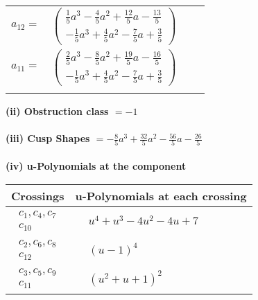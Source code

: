 \documentclass[1p]{elsarticle_modified}
\theoremstyle{definition}
\begin{document}
\begin{tabular}{m{7pt} m{180pt} m{7pt} m{180pt} }
\flushright $a_{12}=$&$\begin{pmatrix}\frac{1}{5} a^3-\frac{4}{5} a^2+\frac{12}{5} a-\frac{13}{5}\\-\frac{1}{5} a^3+\frac{4}{5} a^2-\frac{7}{5} a+\frac{3}{5}\end{pmatrix}$ \\
\flushright $a_{11}=$&$\begin{pmatrix}\frac{2}{5} a^3-\frac{8}{5} a^2+\frac{19}{5} a-\frac{16}{5}\\-\frac{1}{5} a^3+\frac{4}{5} a^2-\frac{7}{5} a+\frac{3}{5}\end{pmatrix}$\\&\end{tabular}
\flushleft \textbf{(ii) Obstruction class $= -1$}\\~\\
\flushleft \textbf{(iii) Cusp Shapes $= -\frac{8}{5} a^3+\frac{32}{5} a^2-\frac{56}{5} a-\frac{26}{5}$}\\~\\
\newpage\renewcommand{\arraystretch}{1}
\flushleft \textbf{(iv) u-Polynomials at the component}\newline \\
\begin{tabular}{m{50pt}|m{274pt}}
Crossings & \hspace{64pt}u-Polynomials at each crossing \\
\hline $$\begin{aligned}c_{1},c_{4},c_{7}\\c_{10}\end{aligned}$$&$\begin{aligned}
&u^4+u^3-4 u^2-4 u+7
\end{aligned}$\\
\hline $$\begin{aligned}c_{2},c_{6},c_{8}\\c_{12}\end{aligned}$$&$\begin{aligned}
&(u-1)^4
\end{aligned}$\\
\hline $$\begin{aligned}c_{3},c_{5},c_{9}\\c_{11}\end{aligned}$$&$\begin{aligned}
&(u^2+u+1)^2
\end{aligned}$\\
\hline
\end{tabular}\\~\\
\end{document}
